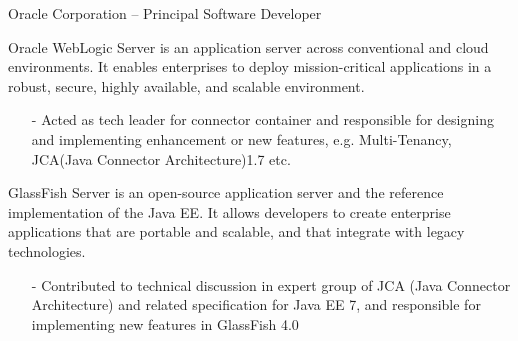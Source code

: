 \documentclass[10pt,a4paper]{moderncv}
\begin{document}
{ Oracle Corporation -- Principal Software Developer}{}{}{}{}
\vspace{1ex}
{
  Oracle WebLogic Server is an application server across conventional and cloud environments. It enables enterprises to deploy mission-critical applications in a robust, secure, highly available, and scalable environment.
  \begin{itemize}
    \item[-] Acted as tech leader for connector container and responsible for designing and implementing enhancement or
               new features, e.g. Multi-Tenancy, JCA(Java Connector Architecture)1.7 etc.
  \end{itemize}
}

\vspace*{0.2\baselineskip}
{
  GlassFish Server is an open-source application server  and the reference implementation of the Java EE. It allows developers to create enterprise
  applications that are portable and scalable,  and that integrate with legacy technologies.
  \begin{itemize}
    \item[-]Contributed to technical discussion in expert group of JCA (Java Connector Architecture) and related specification for Java EE 7, and responsible for implementing new features in GlassFish 4.0
  \end{itemize}
}

%
\vspace{2ex}
\end{document}
